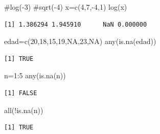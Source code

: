 \documentclass[
  ignorenonframetext,
  aspectratio=169,
  spanish,
]{beamer}
\newenvironment{Shaded}{\begin{snugshade}}{\end{snugshade}}
\newcommand{\CommentTok}[1]{\textcolor[rgb]{0.37,0.37,0.37}{#1}}
\newcommand{\ConstantTok}[1]{\textcolor[rgb]{0.56,0.35,0.01}{#1}}
\newcommand{\DecValTok}[1]{\textcolor[rgb]{0.68,0.00,0.00}{#1}}
\newcommand{\FunctionTok}[1]{\textcolor[rgb]{0.28,0.35,0.67}{#1}}
\newcommand{\NormalTok}[1]{\textcolor[rgb]{0.00,0.23,0.31}{#1}}
\newcommand{\OtherTok}[1]{\textcolor[rgb]{0.00,0.23,0.31}{#1}}
\newcommand{\SpecialCharTok}[1]{\textcolor[rgb]{0.37,0.37,0.37}{#1}}
\begin{document}
\begin{frame}[fragile]{}
\label{section-12}
\begin{Shaded}
\begin{Highlighting}[]
\CommentTok{\#log({-}3)}
\CommentTok{\#sqrt({-}4)}
\NormalTok{x}\OtherTok{=}\FunctionTok{c}\NormalTok{(}\DecValTok{4}\NormalTok{,}\DecValTok{7}\NormalTok{,}\SpecialCharTok{{-}}\DecValTok{4}\NormalTok{,}\DecValTok{1}\NormalTok{)  }
\FunctionTok{log}\NormalTok{(x) }
\end{Highlighting}
\end{Shaded}

\begin{verbatim}
[1] 1.386294 1.945910      NaN 0.000000
\end{verbatim}
\end{frame}

\begin{frame}[fragile]{}
\label{section-13}
\begin{Shaded}
\begin{Highlighting}[]
\NormalTok{edad}\OtherTok{=}\FunctionTok{c}\NormalTok{(}\DecValTok{20}\NormalTok{,}\DecValTok{18}\NormalTok{,}\DecValTok{15}\NormalTok{,}\DecValTok{19}\NormalTok{,}\ConstantTok{NA}\NormalTok{,}\DecValTok{23}\NormalTok{,}\ConstantTok{NA}\NormalTok{)  }
\FunctionTok{any}\NormalTok{(}\FunctionTok{is.na}\NormalTok{(edad))}
\end{Highlighting}
\end{Shaded}

\begin{verbatim}
[1] TRUE
\end{verbatim}

\begin{Shaded}
\begin{Highlighting}[]
\NormalTok{n}\OtherTok{=}\DecValTok{1}\SpecialCharTok{:}\DecValTok{5}
\FunctionTok{any}\NormalTok{(}\FunctionTok{is.na}\NormalTok{(n))}
\end{Highlighting}
\end{Shaded}

\begin{verbatim}
[1] FALSE
\end{verbatim}

\begin{Shaded}
\begin{Highlighting}[]
\FunctionTok{all}\NormalTok{(}\SpecialCharTok{!}\FunctionTok{is.na}\NormalTok{(n)) }
\end{Highlighting}
\end{Shaded}

\begin{verbatim}
[1] TRUE
\end{verbatim}
\end{frame}
\end{document}
